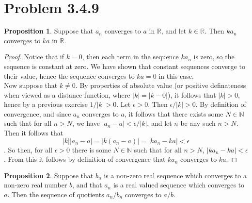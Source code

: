 \documentclass[11pt]{article}
\newcommand{\R}{\mathbb{R}}
\newcommand{\N}{\mathbb{N}}
\theoremstyle{definition}
\newtheorem{proposition}{Proposition}
\begin{document}
\section{Problem 3.4.9}

\begin{proposition}
Suppose that $a_n$ converges to $a$ in $\R$, and let $k\in \R$. Then $ka_n$ converges to $ka$ in $\R$. 
\end{proposition}

\begin{proof}

Notice that if $k = 0$, then each term in the sequence $ka_n$ is zero, so the sequence is constant at zero. We have shown that constant sequences converge to their value, hence the sequence converges to $ka = 0$ in this case.\\

Now suppose that $k \ne 0$. By properties of absolute value (or positive definateness when viewed as a distance function, where $|k| = |k-0|$), it follows that $|k| > 0$, hence by a previous exercise $1/|k| > 0$. Let $\epsilon > 0$. Then $\epsilon/|k| > 0$. By definition of convergence, and since $a_n$ converges to $a$, it follows that there exists some $N\in \N$ such that for all $n> N$, we have $|a_n - a| < \epsilon/|k|$, and let $n$ be any such $n> N$. Then it follows that 
\[|k| |a_n - a| = |k(a_n - a)| = |ka_n - ka| < \epsilon\]. So then, for all $\epsilon > 0$ there is some $N\in \N$ such that for all $n > N$, $|ka_n - ka| < \epsilon$. From this it follows by definition of convergence that $ ka_n $ converges to $ka$.
\end{proof}

\begin{proposition}
Suppose that $b_n$ is a non-zero real sequence which converges to  a non-zero real number $b$, and that $a_n$ is a real valued sequence which converges to $a$. Then the sequence of quotients $a_n/b_n$ converges to $a/b$. 
\end{proposition}
\end{document}
